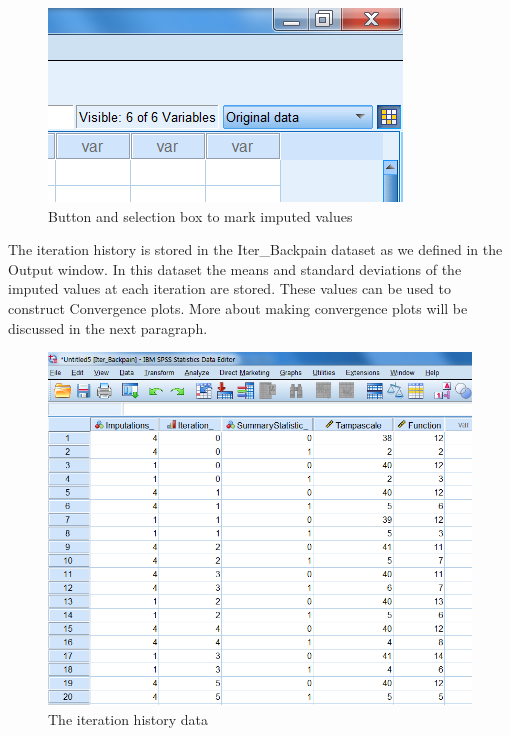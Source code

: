 \documentclass[]{book}
\begin{document}
\begin{figure}

{\centering \includegraphics[width=0.9\linewidth]{images/fig4.11} 

}

\caption{Button and selection box to mark imputed values}\label{fig:fig4-11}
\end{figure}

The iteration history is stored in the Iter\_Backpain dataset as we
defined in the Output window. In this dataset the means and standard
deviations of the imputed values at each iteration are stored. These
values can be used to construct Convergence plots. More about making
convergence plots will be discussed in the next paragraph.

\begin{figure}

{\centering \includegraphics[width=0.9\linewidth]{images/fig4.12} 

}

\caption{The iteration history data}\label{fig:fig4-12}
\end{figure}
\end{document}
